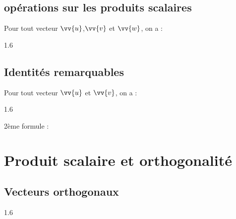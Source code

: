     \subsection{opérations sur les produits scalaires}
    
    \begin{bprop}
        Pour tout vecteur $\vv{u}$,$\vv{v}$ et $\vv{w}$, on a :
        \begin{spacing}{1.6}
        	\begin{enumProp}
        		\item \pointille[\textwidth-1cm]
        		\item \pointille[\textwidth-1cm]
        	\end{enumProp}
        \end{spacing}
    \end{bprop}

    \subsection{Identités remarquables}
    
    \begin{bprop}
        Pour tout vecteur $\vv{u}$ et $\vv{v}$, on a :
        \begin{spacing}{1.6}
        \begin{enumProp}
        	\item \pointille[\textwidth-1cm]
        	\item \pointille[\textwidth-1cm]
        	\item \pointille[\textwidth-1cm]
        \end{enumProp}
    \end{spacing}
    \end{bprop}
    
    \begin{bdemot}{2ème formule : }
    	
    \end{bdemot}
    
       \section{Produit scalaire et orthogonalité}
    
    \subsection{Vecteurs orthogonaux}
    
    \begin{bprop}
        \begin{spacing}{1.6}
        	\dotfill 
        \end{spacing}
    \end{bprop}
    
